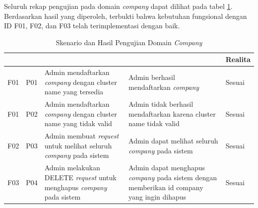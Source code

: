 Seluruh rekap pengujian pada domain \textit{company} dapat dilihat pada tabel \ref{tab:pengujian-domain-company}. Berdasarkan hasil yang diperoleh, terbukti bahwa kebutuhan fungsional dengan ID F01, F02, dan F03 telah terimplementasi dengan baik.


\bgroup
\begin{table}[ht]
  \def\arraystretch{1.5}
  \caption{Skenario dan Hasil Pengujian Domain \textit{Company}}
  \label{tab:pengujian-domain-company}
  \centering
  \begin{tabular}{|p{2cm}|p{2cm}|p{4cm}|p{3cm}|p{2cm}|}
    \hline
    \centering{ID Fungsional} & \centering{ID Pengujian} & \centering{Skenario}                                                                 & \centering{Ekspektasi}                                                                             & Realita \\
    \hline
    F01                       & P01                      & Admin mendaftarkan \textit{company} dengan cluster name yang tersedia                & Admin berhasil mendaftarkan \textit{company}                                                       & Sesuai  \\
    \hline
    F01                       & P02                      & Admin mendaftarkan \textit{company} dengan cluster name yang tidak valid             & Admin tidak berhasil mendaftarkan karena cluster name tidak valid                                  & Sesuai  \\
    \hline
    F02                       & P03                      & Admin membuat \textit{request} untuk melihat seluruh \textit{company} pada sistem    & Admin dapat melihat seluruh \textit{company} pada sistem                                           & Sesuai  \\
    \hline
    F03                       & P04                      & Admin melakukan DELETE \textit{request} untuk menghapus \textit{company} pada sistem & Admin dapat menghapus \textit{company} pada sistem dengan memberikan id company yang ingin dihapus & Sesuai  \\
    \hline
  \end{tabular}
\end{table}
\egroup


